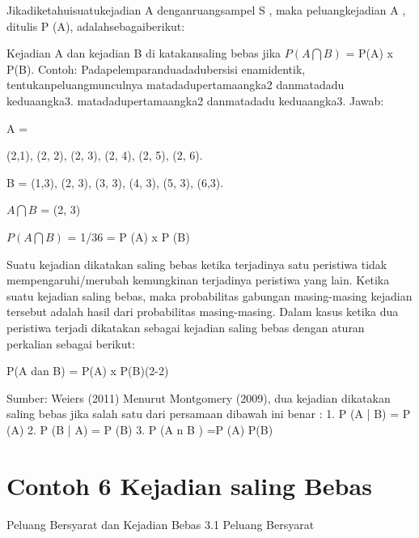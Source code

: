 \documentclass[11pt,fleqn]{book} %
\begin{document}
{\vspace{0.5in}
Jikadiketahuisuatukejadian A denganruangsampel S , maka peluangkejadian A , ditulis P (A), adalahsebagaiberikut:

\vspace{0.5in}
Kejadian A dan kejadian B  di katakansaling bebas 
jika $ P(A \bigcap B) $ = P(A) x P(B). 
Contoh:  Padapelemparanduadadubersisi enamidentik, tentukanpeluangmunculnya matadadupertamaangka2 danmatadadu keduaangka3. matadadupertamaangka2 danmatadadu keduaangka3. 
Jawab:  
\vspace{0.5in}

A = {(2,1), (2, 2), (2, 3), (2, 4), (2, 5), (2, 6). 

\vspace{0.5in}

B = {(1,3), (2, 3), (3, 3), (4, 3), (5, 3), (6,3)}. 
\vspace{0.5in}

$	A \bigcap B $ = {(2, 3)} 

\vspace{0.5in}

$ P(A \bigcap B)$ = 1/36 = P (A) x P (B)

Suatu kejadian dikatakan saling bebas ketika terjadinya satu peristiwa tidak mempengaruhi/merubah kemungkinan terjadinya peristiwa yang lain. Ketika suatu kejadian saling bebas, maka probabilitas gabungan masing-masing kejadian tersebut adalah hasil dari probabilitas masing-masing. Dalam kasus ketika dua peristiwa terjadi dikatakan sebagai kejadian saling bebas dengan aturan perkalian sebagai berikut: 

\vspace{0.5in}

P(A dan B) = P(A) x P(B)(2-2)

\vspace{0.5in}                                                                                                                         

Sumber: Weiers (2011) 
Menurut Montgomery (2009), dua kejadian dikatakan saling bebas jika salah satu dari persamaan dibawah ini benar : 
1. P (A | B) = P (A) 
2. P (B | A) = P (B) 
3. P (A n B ) =P (A) P(B)

\section{Contoh 6 Kejadian saling Bebas}
Peluang Bersyarat dan Kejadian Bebas
3.1 Peluang Bersyarat
\vspace{0.5in}                                                                                                                         

}}
\end{document}
